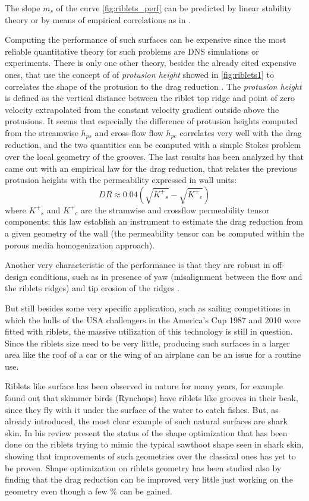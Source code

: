 The slope $m_s$ of the curve \ref{fig:riblets_perf} can be predicted by linear stability theory or by means of empirical correlations as in \citet{garcia2011hydrodynamic}.

Computing the performance of such surfaces can be expensive since the most reliable quantitative theory for such problems are DNS simulations or experiments.
There is only one other theory, besides the already cited expensive ones, that use the concept of of \textit{protusion height} showed in \ref{fig:riblets1} to correlates the shape of the protusion to the drag reduction \citet{luchini1991resistance}.
The \textit{protusion height} is defined as the vertical distance between the riblet top ridge and point of zero velocity extrapolated from the constant velocity gradient outside above the protusions.
It seems that especially the difference of protusion heights computed from the streamwise $h_{ps}$ and cross-flow flow $h_{pc}$ correlates very well with the drag reduction, and the two quantities can be computed with a simple Stokes problem over the local geometry of the grooves.
The last results has been analyzed by \citet{segura2017permeable} that came out with an empirical law for the drag reduction, that relates the previous protusion heights with the permeability expressed in wall units:
$$
DR \approx 0.04\left( \sqrt{{K^+}_s} - \sqrt{{K^+}_c} \right)
$$
where ${K^+}_s$ and ${K^+}_c$ are the stramwise and crossflow permeability tensor components; this law establish an instrument to estimate the drag reduction from a given geometry of the wall (the permeability tensor can be computed within the porous media homogenization approach).

Another very characteristic of the performance is that they are robust in off-design conditions, such as in presence of yaw (misalignment between the flow and the riblets ridges) and tip erosion of the ridges \citet{garcia2011drag}.

But still besides some very specific application, such as  sailing competitions in which the hulls of the USA challengers in the America’s Cup 1987 and 2010 were fitted with riblets, the massive utilization of this technology is still in question.
Since the riblets size need to be very little, producing such surfaces in a larger area like the roof of a car or the wing of an airplane can be an issue for a routine use.

Riblets like surface has been observed in nature for many years, for example \citet{Martin2016riblets} found out that skimmer birds (Rynchops) have riblets like grooves in their beak, since they fly with it under the surface of the water to catch fishes.
But, as already introduced, the most clear example of such natural surfaces are shark skin.
In his review \citet{dean2010shark} present the status of the shape optimization that has been done on the riblets trying to mimic the typical sawthoot shape seen in shark skin, showing that improvements of such geometries over the classical ones has yet to be proven.
Shape optimization on riblets geometry has been studied also by \citet{bechert1997experiments} finding that the drag reduction can be improved very little just working on the geometry even though a few $\%$ can be gained.


